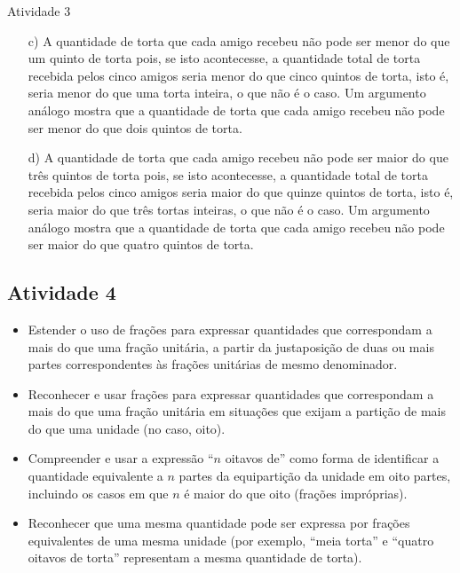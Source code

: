 \begin{multicols}{2}
\begin{resposta*}{Atividade 3}
\begin{enumerate} [\quad a)]
    \item[c)]     A quantidade de torta que cada amigo recebeu não pode ser menor do que um quinto de torta pois, se isto acontecesse, a quantidade total de torta recebida pelos cinco amigos seria menor do que cinco quintos de torta, isto é, seria menor do que uma torta inteira, o que não é o caso. Um argumento análogo mostra que a quantidade de torta que cada amigo recebeu não pode ser menor do que dois quintos de torta.
    \item[d)]       A quantidade de torta que cada amigo recebeu não pode ser maior do que três quintos de torta pois, se isto acontecesse, a quantidade total de torta recebida pelos cinco amigos seria maior do que quinze quintos de torta, isto é, seria maior do que três tortas inteiras, o que não é o caso. Um argumento análogo mostra que a quantidade de torta que cada amigo recebeu não pode ser maior do que quatro quintos de torta.
\end{enumerate} %


\end{resposta*}




\subsection{Atividade 4}

   \vspace{.1cm}

\begin{itemize} %
    \item       Estender o uso de frações para expressar quantidades que correspondam a mais do que uma fração unitária, a partir da justaposição de duas ou mais partes correspondentes às frações unitárias de mesmo denominador.
    \item       Reconhecer e usar frações para expressar quantidades que correspondam a mais do que uma fração unitária em situações que exijam a partição de mais do que uma unidade (no caso, oito).
    \item       Compreender e usar a expressão ``$n$ oitavos de'' como forma de identificar a quantidade equivalente a       $n$ partes da equipartição da unidade em oito partes, incluindo os casos em que $n$ é maior do que oito (frações impróprias).
    \item       Reconhecer que uma mesma quantidade pode ser expressa por frações equivalentes de uma mesma unidade (por exemplo,       ``meia torta''     e       ``quatro oitavos de torta''     representam a mesma quantidade de torta).
\end{itemize} %



\end{multicols}
